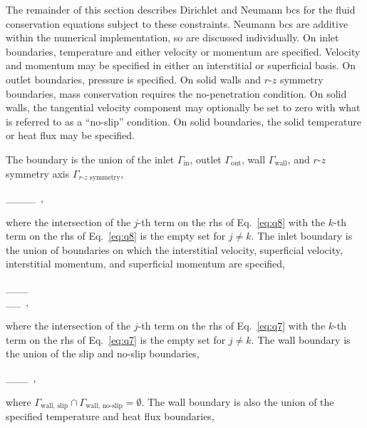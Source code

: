 The remainder of this section describes Dirichlet and Neumann \glspl{bc} for the fluid conservation equations subject to these constraints. Neumann \glspl{bc} are additive within the numerical implementation, so are discussed individually. On inlet boundaries, temperature and either velocity or momentum are specified. Velocity and momentum may be specified in either an interstitial or superficial basis. On outlet boundaries, pressure is specified. On solid walls and \(r\)-\(z\) symmetry boundaries, mass conservation requires the no-penetration condition. On solid walls, the tangential velocity component may optionally be set to zero with what is referred to as a ``no-slip'' condition. On solid boundaries, the solid temperature or heat flux may be specified. 

The boundary is the union of the inlet \(\Gamma_\text{in}\), outlet \(\Gamma_\text{out}\), wall \(\Gamma_\text{wall}\), and $r$-$z$ symmetry axis \(\Gamma_\text{$r$-$z$ symmetry}\),

\beq
\label{eq:q8}
\Gamma\equiv\Gamma_\cup\Gamma_\cup\Gamma_\cup\Gamma_\ ,
\eeq

\noindent where the intersection of the \(j\)-th term on the \gls{rhs} of Eq.\ \eqref{eq:q8} with the \(k\)-th term on the \gls{rhs} of Eq.\ \eqref{eq:q8} is the empty set for \(j\neq k\). The inlet boundary is the union of boundaries on which the interstitial velocity, superficial velocity, interstitial momentum, and superficial momentum are specified,

\beqa
\label{eq:q7}
\Gamma_\equiv\Gamma_\cup\Gamma_\ \cup\hspace{1cm}\\
\Gamma_\cup\Gamma_\ ,
\eeqa

\noindent where the intersection of the \(j\)-th term on the \gls{rhs} of Eq.\ \eqref{eq:q7} with the \(k\)-th term on the \gls{rhs} of Eq.\ \eqref{eq:q7} is the empty set for \(j\neq k\). The wall boundary is the union of the slip and no-slip boundaries, 

\beq
\Gamma_\equiv\Gamma_\cup\Gamma_\ ,
\eeq

\noindent where \(\Gamma_\text{wall, slip}\cap\Gamma_\text{wall, no-slip}=\emptyset\). The wall boundary is also the union of the specified temperature and heat flux boundaries,

